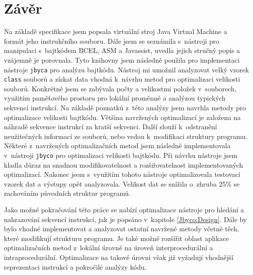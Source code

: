 \chapter{Závěr}\label{Conclusion}


Na základě specifikace \cite{Lindholm:JVM} jsem popsala virtuální stroj Java Virtual Machine a formát jeho instrukčního souboru.  Dále jsem se seznámila s~nástroji pro manipulaci s~bajtkódem BCEL, ASM a Javassist, uvedla jejich stručný popis a vzájemně je porovnala. Tyto knihovny jsem následně použila pro implementaci nástroje \texttt{jbyca} pro analýzu bajtkódu. Nástroj mi umožnil analyzovat velký vzorek \texttt{class} souborů a získat data vhodná k~návrhu metod pro optimalizaci velikosti souborů. Konkrétně jsem se zabývala počty a velikostmi položek v~souborech, využitím paměťového prostoru pro lokální proměnné a analýzou typických sekvencí instrukcí. Na základě poznatků z~této analýzy jsem navrhla metody pro optimalizace velikosti bajtkódu. Většina navržených optimalizací je založena na náhradě sekvence instrukcí za kratší sekvenci. Další slouží k~odstranění neužitečných informací ze souborů, nebo vedou k~modifikaci struktury programu. Některé z~navržených optimalizačních metod jsem následně implementovala v~nástroji \texttt{jbyco} pro optimalizaci velikosti bajtkódu. Při návrhu nástroje jsem kladla důraz na snadnou modifikovatelnost a rozšiřovatelnost implementovaných optimalizací. Nakonec jsem s~využitím tohoto nástroje optimalizovala testovací vzorek dat a výstupy opět analyzovala. 
Velikost dat se snížila o~zhruba 25\% se zachováním původních struktur programů. 

Jako možné pokračování této práce se nabízí optimalizace nástroje pro hledání a nahrazování sekvencí instrukcí, jak je popsáno v~kapitole \ref{Jbyco:Design}.
Dále by bylo vhodné implementovat a analyzovat ostatní navržené metody včetně těch, které modifikují strukturu programu. Je také možné rozšířit oblast aplikace optimalizačních metod z~lokální úrovně na úroveň interprocedurální a intraprocedurální. Optimalizace na takové úrovni však již vyžadují vhodnější reprezentaci instrukcí a pokročilé analýzy kódu.


